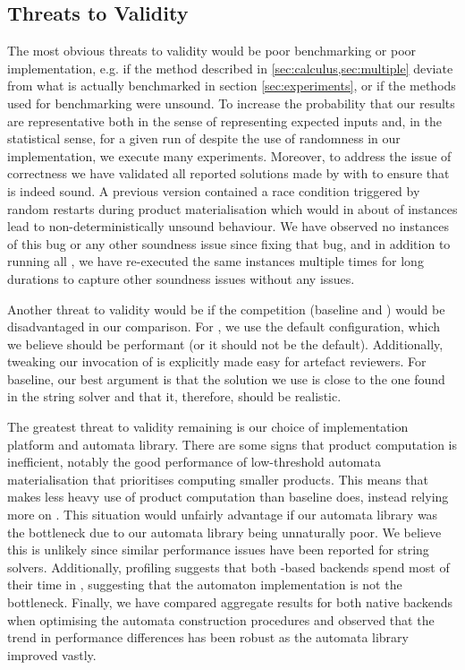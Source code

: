 
\subsection{Threats to Validity}

The most obvious threats to validity would be poor benchmarking or poor
implementation, e.g. if the method described in \cref{sec:calculus,sec:multiple}
deviate from what is actually benchmarked in section \cref{sec:experiments}, or
if the methods used for benchmarking were unsound. To increase the probability
that our results are representative both in the sense of representing expected
inputs and, in the statistical sense, for a given run of \Catra{} despite the
use of randomness in our implementation, we execute many experiments. Moreover,
to address the issue of correctness we have validated all reported solutions
made by \Calculus{} with \Nuxmv{} to ensure that \Calculus{} is indeed sound. A
previous version contained a race condition triggered by random restarts during
product materialisation which would in about  of instances lead to
non-deterministically unsound behaviour. We have observed no instances of this
bug or any other soundness issue since fixing that bug, and in addition to
running all \NrBenchmarks{}, we have re-executed the same instances multiple
times for long durations to capture other soundness issues without any issues.

Another threat to validity would be if the competition (baseline and \Nuxmv)
would be disadvantaged in our comparison. For \Nuxmv{}, we use the default
configuration, which we believe should be performant (or it should not be the
default). Additionally, tweaking our invocation of \Nuxmv{} is explicitly made
easy for artefact reviewers. For baseline, our best argument is that the
solution we use is close to the one found in the \Ostrich{} string solver and
that it, therefore, should be realistic.

The greatest threat to validity remaining is our choice of implementation
platform and automata library. There are some signs that product computation
is inefficient, notably the good performance of low-threshold automata
materialisation that prioritises computing smaller products. This means that
\Calculus{} makes less heavy use of product computation than baseline does,
instead relying more on \Princess{}. This situation would unfairly advantage
\Calculus{} if our automata library was the bottleneck due to our automata
library being unnaturally poor. We believe this is unlikely since similar
performance issues have been reported for string solvers. Additionally,
profiling suggests that both \Princess{}-based backends spend most of their time
in \Princess{}, suggesting that the automaton implementation is not the
bottleneck. Finally, we have compared aggregate results for both native backends
when optimising the automata construction procedures and observed that the trend
in performance differences has been robust as the automata library improved
vastly.

